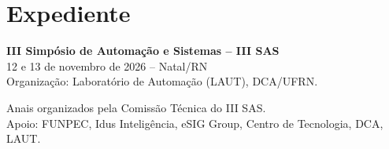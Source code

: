 \documentclass[12pt,a4paper,oneside,openany]{book}
\newcommand{\Autor}[1]{\index[autores]{#1}}
\newcommand{\Artigo}[3]{%
  }
\begin{document}
\Artigo{18_desenvolvimento_de_uma_ferramenta_computacional_em_aplicacao_web_para_simular_o_comportamento_dinamico_do_bombeio_por_cavidades_progressivas_bcp_e_estudar_o_fenomeno_de_reversao_d}
{Desenvolvimento de uma ferramenta computacional em aplicação WEB para simular o comportamento dinâmico do bombeio por cavidades progressivas (BCP) e estudar o fenômeno de reversão do fluxo}
{\Autor{Guilherme da Costa Medeiros Nascimento} \Autor{André Laurindo Maitelli} \Autor{Camila Raquel Sena de Almeida} \Autor{Pedro Manuel Pereira Chamorro} \Autor{Rutácio de Oliveira Costa} }

\backmatter

\printindex[autores]

\chapter*{Expediente}

\noindent\textbf{III Simpósio de Automação e Sistemas -- III SAS}\\
12 e 13 de novembro de 2026 -- Natal/RN\\
Organização: Laboratório de Automação (LAUT), DCA/UFRN.

\vspace{0.5cm}
\noindent Anais organizados pela Comissão Técnica do III SAS.\\
\noindent Apoio: FUNPEC, Idus Inteligência, eSIG Group, Centro de Tecnologia, DCA, LAUT.
\end{document}
